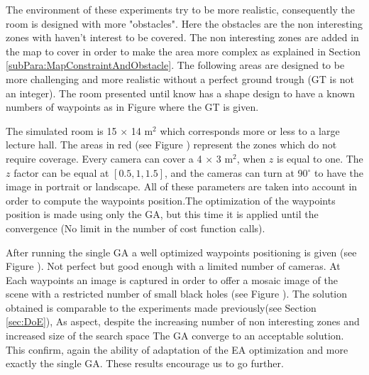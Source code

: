 	The environment of these experiments try to be more realistic, consequently the room is designed with more "obstacles".  Here the obstacles are the non interesting zones with haven't interest to be covered.
	The non interesting zones are added in the map to cover in order to make the area more complex as explained in Section \ref{subPara:MapConstraintAndObstacle}. 
	The following areas are designed to be  more challenging and more realistic without a perfect ground trough (GT is not an integer). The room presented until know has a shape design to have a known numbers of waypoints as in Figure  where the GT is given. 
	
	The simulated room is 15 $\times$ 14 m$^2$ which corresponds more or less to a large lecture hall. The areas in red (see Figure ) represent the zones which do not require coverage. Every camera can cover a 4 $\times$ 3 m$^2$,  when $z$ is equal to one. The $z$ factor can be equal at $[0.5, 1, 1.5]$, and the cameras can turn  at 90$^{\circ}$ to have the image in portrait or landscape. All of these parameters are taken into account in order to compute the waypoints position.The optimization of the waypoints position is made using  only the GA, but this time it is applied until the convergence (No limit in the number of cost function calls). 
	
	 After running the single GA a well optimized waypoints positioning is given (see Figure ). Not perfect but good enough with a limited number of cameras. At Each waypoints an image is captured in order to offer a  mosaic image of the scene with a restricted number of small black holes (see Figure ).
	  The solution obtained is comparable to the experiments made previously(see Section \ref{sec:DoE}), As aspect, despite the increasing number of non interesting zones and increased size of the search space The GA converge to an acceptable solution. This confirm, again the ability of adaptation of the EA optimization and more exactly the single GA. These results encourage us to go further. 

